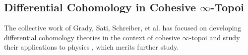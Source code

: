 \documentclass[10pt]{amsart}
\theoremstyle{definition}
\theoremstyle{remark}
\numberwithin{equation}{section}
\begin{document}
\subsection{Differential Cohomology in Cohesive \texorpdfstring{$\infty$}{oo}-Topoi}
The collective work of Grady, Sati, Schreiber, et al. has focused on developing differential cohomology theories in the context of cohesive $\infty$-topoi and study their applications to physics \cite{schreiber2013differentialcohomology,fiorenzasatischreiber2024charactermap}, which merits further study.
  

{\footnotesize


}
\end{document}
